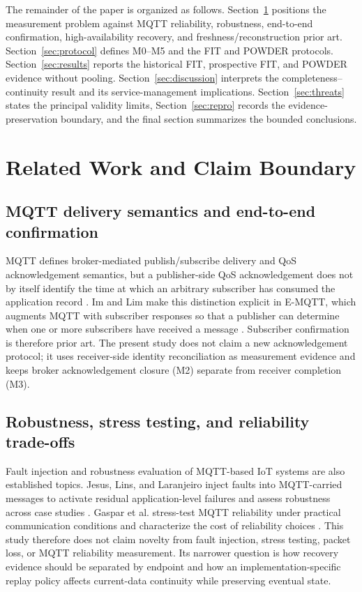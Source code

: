\documentclass[journal]{IEEEtran}
\begin{document}
The remainder of the paper is organized as follows. Section~\ref{sec:related} positions the measurement problem against MQTT reliability, robustness, end-to-end confirmation, high-availability recovery, and freshness/reconstruction prior art. Section~\ref{sec:protocol} defines M0--M5 and the FIT and POWDER protocols. Section~\ref{sec:results} reports the historical FIT, prospective FIT, and POWDER evidence without pooling. Section~\ref{sec:discussion} interprets the completeness--continuity result and its service-management implications. Section~\ref{sec:threats} states the principal validity limits, Section~\ref{sec:repro} records the evidence-preservation boundary, and the final section summarizes the bounded conclusions.

\section{Related Work and Claim Boundary}
\label{sec:related}

\subsection{MQTT delivery semantics and end-to-end confirmation}

MQTT defines broker-mediated publish/subscribe delivery and QoS acknowledgement semantics, but a publisher-side QoS acknowledgement does not by itself identify the time at which an arbitrary subscriber has consumed the application record \cite{mqtt5}. Im and Lim make this distinction explicit in E-MQTT, which augments MQTT with subscriber responses so that a publisher can determine when one or more subscribers have received a message \cite{emqtt}. Subscriber confirmation is therefore prior art. The present study does not claim a new acknowledgement protocol; it uses receiver-side identity reconciliation as measurement evidence and keeps broker acknowledgement closure (M2) separate from receiver completion (M3).

\subsection{Robustness, stress testing, and reliability trade-offs}

Fault injection and robustness evaluation of MQTT-based IoT systems are also established topics. Jesus, Lins, and Laranjeiro inject faults into MQTT-carried messages to activate residual application-level failures and assess robustness across case studies \cite{jesus2025}. Gaspar et al. stress-test MQTT reliability under practical communication conditions and characterize the cost of reliability choices \cite{gaspar2026}. This study therefore does not claim novelty from fault injection, stress testing, packet loss, or MQTT reliability measurement. Its narrower question is how recovery evidence should be separated by endpoint and how an implementation-specific replay policy affects current-data continuity while preserving eventual state.
\end{document}
